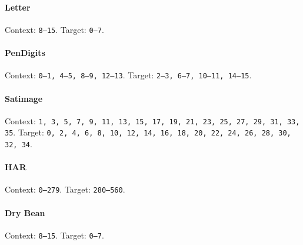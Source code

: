 \paragraph{Letter} Context: \texttt{8--15}. Target: \texttt{0--7}.

\paragraph{PenDigits} Context: \texttt{0--1, 4--5, 8--9, 12--13}. Target: \texttt{2--3, 6--7, 10--11, 14--15}.

\paragraph{Satimage} Context: \texttt{1, 3, 5, 7, 9, 11, 13, 15, 17, 19, 21, 23, 25, 27, 29, 31, 33, 35}. Target: \texttt{0, 2, 4, 6, 8, 10, 12, 14, 16, 18, 20, 22, 24, 26, 28, 30, 32, 34}.

\paragraph{HAR} Context: \texttt{0--279}. Target: \texttt{280--560}.

\paragraph{Dry Bean} Context: \texttt{8--15}. Target: \texttt{0--7}.

